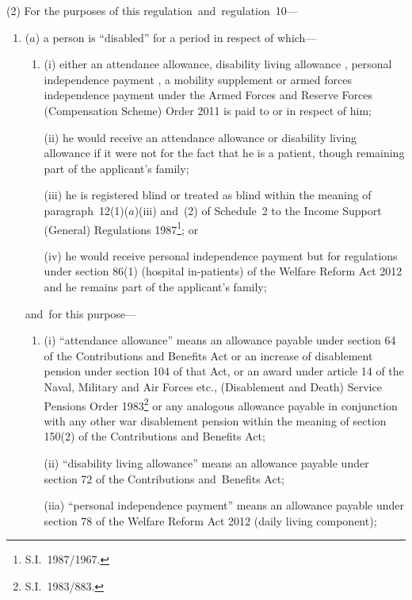 \documentclass[12pt,a4paper]{article}
\begin{document}
(2) For the purposes of this regulation~and~regulation~10—
\begin{enumerate}\item[]
($a$) a person is “disabled” for a period in respect of which—
\begin{enumerate}\item[]
(i) either an attendance allowance, disability living allowance%
, personal independence payment%
, a mobility supplement or armed forces independence payment under the Armed Forces and Reserve Forces (Compensation Scheme) Order 2011  %
is paid to or in respect of him;

(ii) he would receive an attendance allowance or disability living allowance if it were not for the fact that he is a patient, though remaining part of the applicant’s family; 

(iii) he is registered blind or treated as blind within the meaning of paragraph~12(1)($a$)(iii)  and~(2) of Schedule~2 to the Income Support (General) Regulations 1987\footnote{S.I.\ 1987/1967.};
%
or

(iv) he would receive personal independence payment but for regulations under section 86(1) (hospital in-patients) of the Welfare Reform Act 2012 and he remains part of the applicant’s family;
\end{enumerate}
and~for this purpose—
\begin{enumerate}\item[]
(i) “attendance allowance” means an allowance payable under section 64 of the Contributions and Benefits Act or an increase of disablement pension under section 104 of that Act, or an award under article 14 of the Naval, Military and Air Forces etc., (Disablement and Death) Service Pensions Order 1983\footnote{S.I.\ 1983/883.} or any analogous allowance payable in conjunction with any other war disablement pension within the meaning of section 150(2) of the Contributions and Benefits Act;

(ii) “disability living allowance” means an allowance payable under section 72 of the Contributions and~Benefits Act;

(iia) “personal independence payment” means an allowance payable under section 78 of the Welfare Reform Act 2012 (daily living component);


\end{enumerate}
\end{enumerate}
\end{document}
